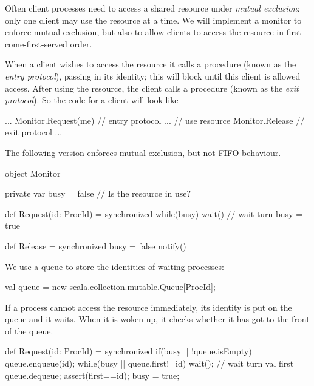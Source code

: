 
\begin{slide}

Often client processes need to access a shared resource under \emph{mutual
  exclusion}: only one client may use the resource at a time.  We will
implement a monitor to enforce mutual exclusion, but also to allow clients
to access the resource in first-come-first-served order.  

When a client wishes to access the resource it calls a 
procedure (known as the \emph{entry protocol}), passing in its identity; this
will block until this client is allowed access.  After using the resource, the
client calls a  procedure (known as the \emph{exit protocol}).
So the code for a client will look like
%
\begin{scala}
...
Monitor.Request(me) // entry protocol
...                  // use resource
Monitor.Release     // exit protocol
...
\end{scala}
\end{slide}


\begin{slide}

The following version enforces mutual exclusion, but not FIFO behaviour.
%
\begin{scala}
object Monitor{
  private var busy = false // Is the resource in use?

  def Request(id: ProcId) = synchronized{
    while(busy) wait() // wait turn
    busy = true
  }

  def Release = synchronized{
      busy = false
      notify()
  }
}
\end{scala}
\end{slide}


\begin{slide}

We use a queue to store the identities of waiting processes:
%
\begin{scala}
val queue = new scala.collection.mutable.Queue[ProcId];
\end{scala}

If a process cannot access the resource immediately, its identity is put on
the queue and it waits.  When it is woken up, it checks whether it has got to
the front of the queue.
%
\begin{scala}
def Request(id: ProcId) = synchronized{
  if(busy || !queue.isEmpty){
    queue.enqueue(id);
    while(busy || queue.first!=id) wait(); // wait turn
    val first = queue.dequeue;
    assert(first==id);
  }
  busy = true;
}
\end{scala}
\end{slide}

